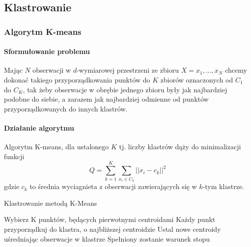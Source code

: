 \documentclass{article}
\begin{document}
\subsection{Klastrowanie}
\subsubsection{Algorytm K-means}
\paragraph{Sformułowanie problemu}

Mając \(N\) obserwacji w \(d\)-wymiarowej przestrzeni ze zbioru \(X = {x_1, ..., x_N}\) chcemy dokonać takiego przyporządkowania punktów do \(K\) zbiorów oznaczonych od \(C_1\) do \(C_K\), tak żeby obserwacje w obrębie jednego zbioru były jak najbardziej podobne do siebie, a zarazem jak najbardziej odmienne od punktów przyporządkowanych do innych klastrów.\

\paragraph{Działanie algorytmu}
Algorytm K-means, dla ustalonego \(K\) tj. liczby klastrów dąży do minimalizacji funkcji 
\[Q = \sum\limits^K_{k=1}\sum\limits_{x_i \in C_k} ||x_i - c_k||^2\]
gdzie \(c_k\) to średnia wyciagnieta z obserwacji zawierających się w \(k\)-tym klastrze.

\begin{algorithm}
\label{class_kmeans_alg}
\caption{Klastrowanie metodą K-Means}
\begin{algorithmic}[1]
\STATE Wybierz K punktów, będących pierwotnymi centroidami
\REPEAT
\STATE Każdy punkt przyporządkuj do klastra, o najbliższej centroidzie
\STATE Ustal nowe centroidy uśredniając obserwacje w klastrze
\UNTIL Spełniony zostanie warunek stopu
\end{algorithmic}
\end{algorithm}	
\end{document}
